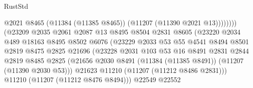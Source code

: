\begin{lexlean}{RustStd}
\begin{coremodule}
                                              @2021
                                              @8465
                                              (@11384 (@11385 @8465))
                                              (@11207 (@11390 @2021 @13))))))))
                                  (@23209
                                    @2035
                                    @2061
                                    @2087
                                    @13
                                    @8495
                                    @8504
                                    @2831
                                    @8605
                                    (@23220
                                      @2034
                                      @489
                                      @18163
                                      @8495
                                      @8502
                                      @6076
                                      (@23229
                                        @2033
                                        @53
                                        @55
                                        @4541
                                        @8494
                                        @8501
                                        @2819
                                        @8475
                                        @2825
                                        @21696
                                        (@23228
                                          @2031
                                          @103
                                          @53
                                          @16
                                          @8491
                                          @2831
                                          @2844
                                          @2819
                                          @8485
                                          @2825
                                          (@21656
                                            @2030
                                            @8491
                                            (@11384 (@11385 @8491))
                                            (@11207 (@11390 @2030 @53)))
                                          @21623
                                          @11210
                                          (@11207 (@11212 @8486 @2831)))
                                        @11210
                                        (@11207 (@11212 @8476 @8494)))
                                      @22549
                                      @22552

\end{coremodule}
\end{lexlean}
